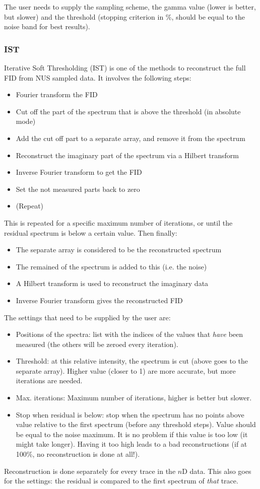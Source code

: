 \documentclass[11pt,a4paper]{article}
\begin{document}
The user needs to supply the sampling scheme, the gamma value (lower is better, but slower) and the threshold (stopping criterion in \%, should be equal to the noise band for best results).



\subsubsection{IST}
Iterative Soft Thresholding (IST) is one of the methods to reconstruct the full FID from NUS sampled data. It involves the following steps:
\begin{itemize}
  \item Fourier transform the FID
  \item Cut off the part of the spectrum that is above the threshold (in absolute mode)
  \item Add the cut off part to a separate array, and remove it from the spectrum
  \item Reconstruct the imaginary part of the spectrum via a Hilbert transform
  \item Inverse Fourier transform to get the FID
  \item Set the not measured parts back to zero
\item (Repeat)
\end{itemize}
This is repeated for a specific maximum number of iterations, or until the residual spectrum is below a certain value.
Then finally:
\begin{itemize}
  \item The separate array is considered to be the reconstructed spectrum
  \item The remained of the spectrum is added to this (i.e. the noise)
  \item A Hilbert transform is used to reconstruct the imaginary data
  \item Inverse Fourier transform gives the reconstructed FID
\end{itemize}
The settings that need to be supplied by the user are:
\begin{itemize}
  \item Positions of the spectra: list with the indices of the values that \textit{have} been measured (the others will be zeroed every iteration).
  \item Threshold: at this relative intensity, the spectrum is cut (above goes to the separate array). Higher value (closer to 1) are more accurate, but more iterations are needed.
  \item Max. iterations: Maximum number of iterations, higher is better but slower.
  \item Stop when residual is below: stop when the spectrum has no points above value relative to the first spectrum (before any threshold steps). Value should be equal to the noise maximum.
	 It is no problem if this value is too low (it might take longer). Having it too high leads to a bad reconstructions (if at 100\%, no reconstruction is done at all!).
\end{itemize}
Reconstruction is done separately for every trace in the $n$D data. This also goes for the settings: the residual is compared to the first spectrum of \textit{that} trace.
\end{document}
